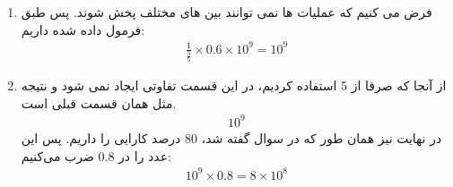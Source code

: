 \begin{enumerate}
    \item فرض می کنیم که عملیات ها نمی توانند بین های مختلف پخش شوند.
    پس طبق فرمول داده شده داریم:
    \begin{gather*}
        \frac{1}{\frac{3}{5}} \times 0.6 \times 10^9 = 10^9
    \end{gather*}
    \item از آنجا که صرفا از 5  استفاده کردیم، در این قسمت تفاوتی ایجاد نمی شود و نتیجه مثل همان قسمت قبلی است.
    \begin{gather*}
        10^9
    \end{gather*}
    در نهایت نیز همان طور که در سوال گفته شد، 80 درصد کارایی را داریم. پس این عدد را در 0.8 ضرب می‌کنیم:
    \begin{gather*}
        10^9 \times 0.8 = 8 \times 10^8
    \end{gather*}
\end{enumerate}